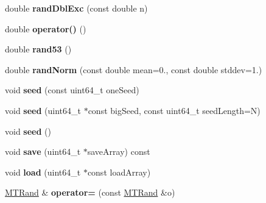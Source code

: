 \begin{DoxyCompactItemize}
\item 
\hypertarget{classMTRand_a1a81d8f00de8f553d4b8626d64e1c544}{double {\bfseries rand\-Dbl\-Exc} (const double n)}\label{classMTRand_a1a81d8f00de8f553d4b8626d64e1c544}

\item 
\hypertarget{classMTRand_abbb87a08d622d58fdee0eea4cb5471a0}{double {\bfseries operator()} ()}\label{classMTRand_abbb87a08d622d58fdee0eea4cb5471a0}

\item 
\hypertarget{classMTRand_a15f4daf79febbe4ff43c3e6ce2c4fcbe}{double {\bfseries rand53} ()}\label{classMTRand_a15f4daf79febbe4ff43c3e6ce2c4fcbe}

\item 
\hypertarget{classMTRand_a4c284f626b6d40a0367ff2a949ea1944}{double {\bfseries rand\-Norm} (const double mean=0., const double stddev=1.)}\label{classMTRand_a4c284f626b6d40a0367ff2a949ea1944}

\item 
\hypertarget{classMTRand_aa14afdf05231b303915d3ede9083933c}{void {\bfseries seed} (const uint64\-\_\-t one\-Seed)}\label{classMTRand_aa14afdf05231b303915d3ede9083933c}

\item 
\hypertarget{classMTRand_a685897ab29cb57074ddb663f2aaf3571}{void {\bfseries seed} (uint64\-\_\-t $\ast$const big\-Seed, const uint64\-\_\-t seed\-Length=N)}\label{classMTRand_a685897ab29cb57074ddb663f2aaf3571}

\item 
\hypertarget{classMTRand_ad88ea3363d55bafb62826bbd130279c2}{void {\bfseries seed} ()}\label{classMTRand_ad88ea3363d55bafb62826bbd130279c2}

\item 
\hypertarget{classMTRand_ac3dc3ece794feff49ba83ed2fa7a4da2}{void {\bfseries save} (uint64\-\_\-t $\ast$save\-Array) const }\label{classMTRand_ac3dc3ece794feff49ba83ed2fa7a4da2}

\item 
\hypertarget{classMTRand_add6ab0d26a0edeedd46853accae4eb1a}{void {\bfseries load} (uint64\-\_\-t $\ast$const load\-Array)}\label{classMTRand_add6ab0d26a0edeedd46853accae4eb1a}

\item 
\hypertarget{classMTRand_a3a6eb21add6f6ef4ce2d3280f2518521}{\hyperlink{classMTRand}{M\-T\-Rand} \& {\bfseries operator=} (const \hyperlink{classMTRand}{M\-T\-Rand} \&o)}\label{classMTRand_a3a6eb21add6f6ef4ce2d3280f2518521}


\end{DoxyCompactItemize}
